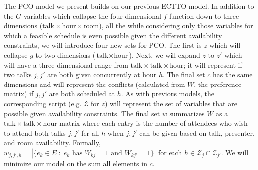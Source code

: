 \documentclass{svjour3}                     %
\begin{document}
The PCO model we present builds on our previous ECTTO model. In addition to the $G$ variables which collapse the four dimensional $f$ function down to three dimensions ($\text{talk} \times \text{hour} \times \text{room}$), all the while considering only those variables for which a feasible schedule is even possible given the different availability constraints, we will introduce four new sets for PCO. The first is $z$ which will collapse $g$ to two dimensions ($\text{talk} \times \text{hour}$). Next, we will expand $z$ to $z'$ which will have a three dimensional range from $\text{talk} \times \text{talk} \times \text{hour}$; it will represent if two talks $j, j'$ are both given concurrently at hour $h$. The final set $c$ has the same dimensions and will represent the conflicts (calculated from $W$, the preference matrix) if $j, j'$ are both scheduled at $h$. As with previous models, the corresponding script (e.g. $\mathcal Z$ for $z$) will represent the set of variables that are possible given availability constraints. The final set $w$ summarizes $W$ as a $\text{talk} \times \text{talk} \times \text{hour}$ matrix where each entry is the number of attendees who wish to attend both talks $j,j'$ for all $h$ when $j,j'$ can be given based on talk, presenter, and room availability. Formally, $w_{j,j',h} = |\{e_k \in E \; : \; e_k \text{ has } W_{kj} = 1 \text{ and } W_{kj'} = 1 \}|$ for each $h \in \mathcal{Z}_{j} \cap \mathcal{Z}_{j'}$. We will minimize our model on the sum all elements in $c$.
\end{document}
